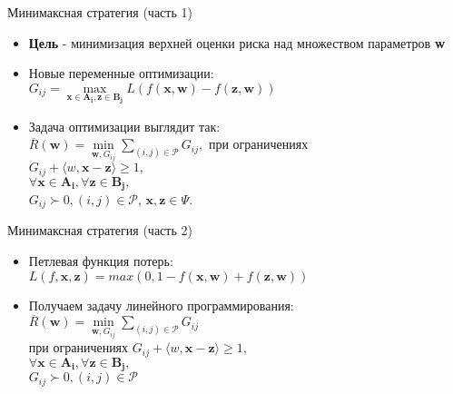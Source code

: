 \documentclass[11pt]{beamer}
\newcommand{\Rho}{%
	\mathcal{P}%
}
\begin{document}
\begin{frame}{Минимаксная стратегия (часть 1)}

\begin{itemize}
	\item \textbf{Цель} - минимизация верхней оценки риска над множеством параметров \textbf{w}
	\item Новые переменные оптимизации:\\
		\(G_{ij} = \underset{\mathbf{x} \in \mathbf{A_i}, \mathbf{z} \in \mathbf{B_j}}{\operatorname{max}} L (f (\mathbf{x}, \mathbf{w}) - f(\mathbf{z}, \mathbf{w}))\)
	\item Задача оптимизации выглядит так:\\
		\(\overline{R}(\mathbf{w}) = \underset{\mathbf{w}, G_{ij}}{\operatorname{min}} \sum \limits_{(i, j) \in \Rho} G_{ij},\) при ограничениях\\
		\(G_{ij} + \langle w, \mathbf{x} - \mathbf{z} \rangle \geq 1,\) \\ 
		\(\forall \mathbf{x} \in \mathbf{A_i}, \forall \mathbf{z} \in \mathbf{B_j}, \) \\
		\(G_{ij} \succ 0, (i, j) \in \Rho\), \(\mathbf{x},\mathbf{z} \in \Psi\).
\end{itemize}

\end{frame}
\begin{frame}{Минимаксная стратегия (часть 2)}

\begin{itemize}
	\item Петлевая функция потерь:\\
		\(L(f, \mathbf{x}, \mathbf{z}) = max (0,1 - f(\mathbf{x}, \mathbf{w}) + f(\mathbf{z}, \mathbf{w}))\)
	\item Получаем задачу линейного программирования:\\
		\(\overline{R}(\mathbf{w}) = \underset{\mathbf{w}, G_{ij}}{\operatorname{min}} \sum \limits_{(i, j) \in \Rho} G_{ij}\) \\
		при ограничениях \(G_{ij} + \langle w, \mathbf{x} - \mathbf{z} \rangle \geq 1,\) \\ 
		\(\forall \mathbf{x} \in \mathbf{A_i}, \forall \mathbf{z} \in \mathbf{B_j}, \)\\
		\(G_{ij} \succ 0, (i, j) \in \Rho\)
\end{itemize}

\end{frame}
\end{document}
